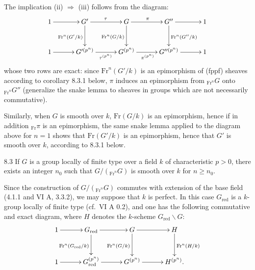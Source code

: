 The implication (ii) $\Rightarrow$ (iii) follows from the diagram:
\[
\xymatrix@C=3em@R=3em{1\ar[r]&G'\ar[r]^\tau\ar[d]_{\mathrm{Fr}^n(G'/k)}&G\ar[r]^\pi\ar[d]_{\mathrm{Fr}^n(G/k)}&G''\ar[r]\ar[d]^{\mathrm{Fr}^n(G''/k)}&1\\
1\ar[r]&G'^{(p^n)}\ar[r]_{\tau^{(p^n)}}&G^{(p^n)}\ar[r]_{\pi^{(p^n)}}&G''^{(p^n)}\ar[r]&1}
\]
whose two rows are exact: since $\mathrm{Fr}^n(G'/k)$ is an epimorphism of (fppf) sheaves according to corollary 8.3.1 below, $\pi$ induces an epimorphism from ${}_{\mathrm{Fr}^n}G$ onto ${}_{\mathrm{Fr}^n}G''$ (generalize the snake lemma to sheaves in groups which are not necessarily commutative).

Similarly, when $G$ is smooth over $k$, $\mathrm{Fr}(G/k)$ is an epimorphism, hence if in addition ${}_{\mathrm{Fr}}\pi$ is an epimorphism, the same snake lemma applied to the diagram above for $n=1$ shows that $\mathrm{Fr}(G'/k)$ is an epimorphism, hence that $G'$ is smooth over $k$, according to 8.3.1 below.

\begin{proposition}{8.3}\label{VIIA.8.3}
If $G$ is a group locally of finite type over a field $k$ of characteristic $p>0$, there exists an integer $n_0$ such that $G/({}_{\mathrm{Fr}^n}G)$ is smooth over $k$ for $n\geq n_0$.
\end{proposition}
Since the construction of $G/({}_{\mathrm{Fr}^n}G)$ commutes with extension of the base field (4.1.1 and VI A, 3.3.2), we may suppose that $k$ is perfect. In this case $G_{\mathrm{red}}$ is a $k$-group locally of finite type (cf.\ VI A 0.2), and one has the following commutative and exact diagram, where $H$ denotes the $k$-scheme $G_{\mathrm{red}}\backslash G$:
\[
\xymatrix@C=3em@R=3em{1\ar[r]&G_{\mathrm{red}}\ar[r]\ar[d]_{\mathrm{Fr}^n(G_{\mathrm{red}}/k)}&G\ar[r]\ar[d]_{\mathrm{Fr}^n(G/k)}&H\ar[d]^{\mathrm{Fr}^n(H/k)}\\
1\ar[r]&G_{\mathrm{red}}^{(p^n)}\ar[r]&G^{(p^n)}\ar[r]&H^{(p^n)}.}
\]

